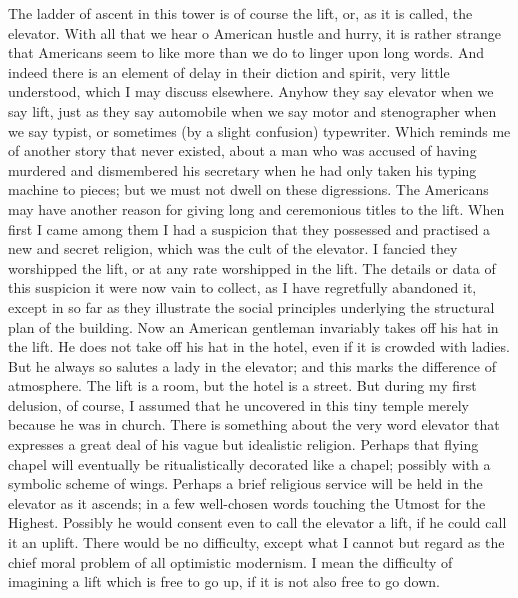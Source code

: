 \documentclass{book}
\begin{document}
The ladder of ascent in this tower is of course the lift, or, as it is called, the elevator. With all that we hear o American hustle and hurry, it is rather strange that Americans seem to like more than we do to linger upon long words. And indeed there is an element of delay in their diction and spirit, very little understood, which I may discuss elsewhere. Anyhow they say elevator when we say lift, just as they say automobile when we say motor and stenographer when we say typist, or sometimes (by a slight confusion) typewriter. Which reminds me of another story that never existed, about a man who was accused of having murdered and dismembered his secretary when he had only taken his typing machine to pieces; but we must not dwell on these digressions. The Americans may have another reason for giving long and ceremonious titles to the lift. When first I came among them I had a suspicion that they possessed and practised a new and secret religion, which was the cult of the elevator. I fancied they worshipped the lift, or at any rate worshipped in the lift. The details or data of this suspicion it were now vain to collect, as I have regretfully abandoned it, except in so far as they illustrate the social principles underlying the structural plan of the building. Now an American gentleman invariably takes off his hat in the lift. He does not take off his hat in the hotel, even if it is crowded with ladies. But he always so salutes a lady in the elevator; and this marks the difference of atmosphere. The lift is a room, but the hotel is a street. But during my first delusion, of course, I assumed that he uncovered in this tiny temple merely because he was in church. There is something about the very word elevator that expresses a great deal of his vague but idealistic religion. Perhaps that flying chapel will eventually be ritualistically decorated like a chapel; possibly with a symbolic scheme of wings. Perhaps a brief religious service will be held in the elevator as it ascends; in a few well-chosen words touching the Utmost for the Highest. Possibly he would consent even to call the elevator a lift, if he could call it an uplift. There would be no difficulty, except what I cannot but regard as the chief moral problem of all optimistic modernism. I mean the difficulty of imagining a lift which is free to go up, if it is not also free to go down.
\end{document}
